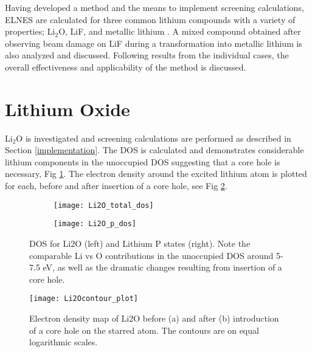 
Having developed a method and the means to implement screening calculations, ELNES are calculated for three common lithium compounds with a variety of properties; $\mathrm{Li_2O}$, LiF, and metallic lithium  .  A mixed compound obtained after observing beam damage on LiF during a transformation into metallic lithium is also analyzed and discussed.  Following results from the individual cases, the overall effectiveness and applicability of the method is discussed.




\section{Lithium Oxide}

 $ \mathrm{Li_2O} $ is investigated and screening calculations are performed as described in Section \ref{implementation}. The DOS is calculated and demonstrates considerable lithium components in the unoccupied DOS suggesting that a core hole is necessary, Fig \ref{Li2O_dos}.   The electron density around the excited lithium atom is plotted for each, before and after insertion of a core hole, see Fig \ref{Li2O_contour}.  \\


\begin{figure}
	\centering
	\begin{subfigure}{0.45\textwidth}
		\texttt{[image: Li2O\_total\_dos]}
	\end{subfigure}
	\hspace{-0.01cm}
	\begin{subfigure}{0.45\textwidth}
		\texttt{[image: Li2O\_p\_dos]}
	\end{subfigure}
	
	\caption{DOS for $ \mathrm{Li2O} $ (left) and Lithium P states (right).  Note the comparable Li vs O contributions in the unoccupied DOS around 5-7.5 eV, as well as the dramatic changes resulting from insertion of a core hole.}
	\label{Li2O_dos}
\end{figure}

\begin{figure}
	\centering
	\texttt{[image: Li2Ocontour\_plot]}
	\caption{Electron density map of $ \mathrm{Li2O} $ before (a) and after (b) introduction of a core hole on the starred atom.  The contours are on equal logarithmic scales. }
	\label{Li2O_contour}
\end{figure}

